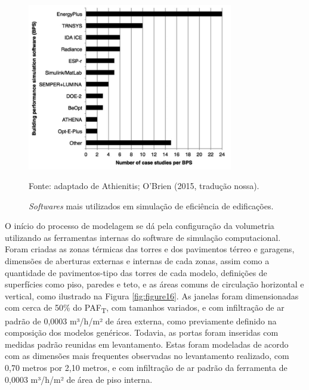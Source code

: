 \begin{figure}[H]
    \centering
    \caption{\textit{Softwares} mais utilizados em simulação de eficiência de edificações.}
    \includegraphics[width=0.8\textwidth]{figures/fig15-grafico-soft.png}
    \begin{flushleft}
        \par \small Fonte: adaptado de Athienitis; O’Brien (2015, tradução nossa).
    \end{flushleft}
    \label{fig:figure15}
\end{figure}
\noindent O início do processo de modelagem se dá pela configuração da volumetria utilizando as ferramentas internas do software de simulação computacional. Foram criadas as zonas térmicas das torres e dos pavimentos térreo e garagens, dimensões de aberturas externas e internas de cada zonas, assim como a quantidade de pavimentos-tipo das torres de cada modelo, definições de superfícies como piso, paredes e teto, e as áreas comuns de circulação horizontal e vertical, como ilustrado na Figura \ref{fig:figure16}.\vspace*{0.3cm} \newline
\noindent As janelas foram dimensionadas com cerca de 50\% do PAF\textsubscript{T}, com tamanhos variados, e com infiltração de ar padrão de 0,0003 m³/h/m² de área externa, como previamente definido na composição dos modelos genéricos. Todavia, as portas foram inseridas com medidas padrão reunidas em levantamento. Estas foram modeladas de acordo com as dimensões mais frequentes observadas no levantamento realizado, com 0,70 metros por 2,10 metros, e com infiltração de ar padrão da ferramenta de 0,0003 m³/h/m² de área de piso interna.\vspace*{0.3cm} \newline
